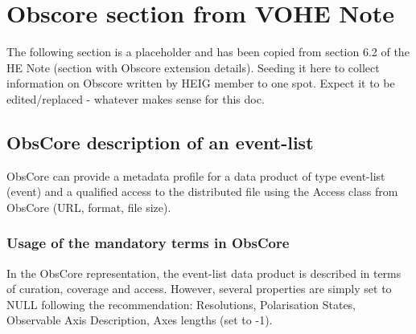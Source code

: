 \documentclass[11pt,a4paper]{ivoa}
\begin{document}

\section{Obscore section from VOHE Note}
The following section is a placeholder and has been copied from section 6.2 of the HE Note (section with Obscore extension details).  Seeding it here to collect information on Obscore written by HEIG member to one spot.  Expect it to be edited/replaced - whatever makes sense for this doc.

\subsection{ObsCore description of an event-list}
\label{sec:obscore_he}

ObsCore \citep{2017ivoa.spec.0509L} can provide a metadata profile for a data product of type event-list (event) and a qualified access to the distributed file using the Access class from ObsCore (URL, format, file size).

\subsubsection{Usage of the mandatory terms in ObsCore}

In the ObsCore representation, the event-list data product is described in terms of curation, coverage and access. However, several properties are simply set to NULL following the recommendation: Resolutions, Polarisation States, Observable Axis Description, Axes lengths (set to -1).
\end{document}
